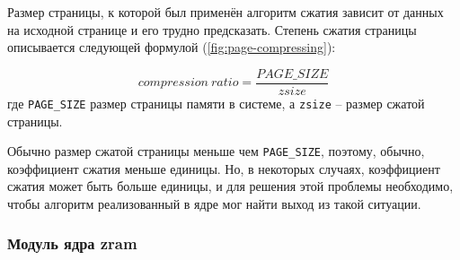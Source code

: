 Размер страницы, к которой был применён алгоритм сжатия зависит от данных на исходной странице и его трудно предсказать. Степень сжатия страницы описывается следующей формулой (\ref{fig:page-compressing}):

\begin{equation}\label{fig:page-compressing}
	compression\ ratio = \frac{PAGE\_SIZE}{zsize}
\end{equation}
где \texttt{PAGE\_SIZE} размер страницы памяти в системе, а \texttt{zsize} -- размер сжатой страницы. 

Обычно размер сжатой страницы меньше чем \texttt{PAGE\_SIZE}, поэтому, обычно, коэффициент сжатия меньше единицы. Но, в некоторых случаях, коэффициент сжатия может быть больше единицы, и для решения этой проблемы необходимо, чтобы алгоритм реализованный в ядре мог найти выход из такой ситуации.

\subsubsection{Модуль ядра zram}

\pagebreak
